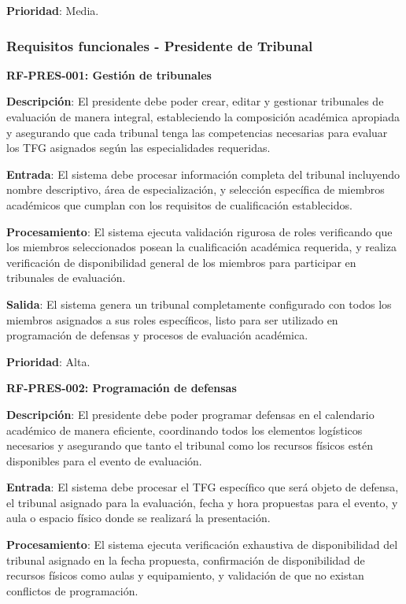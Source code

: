 \documentclass[12pt,a4paper,oneside]{report}
\begin{document}
\textbf{Prioridad}: Media.

\subsubsection{Requisitos funcionales - Presidente de
Tribunal}\label{requisitos-funcionales---presidente-de-tribunal}

\textbf{RF-PRES-001: Gestión de tribunales}

\textbf{Descripción}: El presidente debe poder crear, editar y gestionar tribunales de evaluación de manera integral, estableciendo la composición académica apropiada y asegurando que cada tribunal tenga las competencias necesarias para evaluar los TFG asignados según las especialidades requeridas.

\textbf{Entrada}: El sistema debe procesar información completa del tribunal incluyendo nombre descriptivo, área de especialización, y selección específica de miembros académicos que cumplan con los requisitos de cualificación establecidos.

\textbf{Procesamiento}: El sistema ejecuta validación rigurosa de roles verificando que los miembros seleccionados posean la cualificación académica requerida, y realiza verificación de disponibilidad general de los miembros para participar en tribunales de evaluación.

\textbf{Salida}: El sistema genera un tribunal completamente configurado con todos los miembros asignados a sus roles específicos, listo para ser utilizado en programación de defensas y procesos de evaluación académica.

\textbf{Prioridad}: Alta.

\textbf{RF-PRES-002: Programación de defensas}

\textbf{Descripción}: El presidente debe poder programar defensas en el calendario académico de manera eficiente, coordinando todos los elementos logísticos necesarios y asegurando que tanto el tribunal como los recursos físicos estén disponibles para el evento de evaluación.

\textbf{Entrada}: El sistema debe procesar el TFG específico que será objeto de defensa, el tribunal asignado para la evaluación, fecha y hora propuestas para el evento, y aula o espacio físico donde se realizará la presentación.

\textbf{Procesamiento}: El sistema ejecuta verificación exhaustiva de disponibilidad del tribunal asignado en la fecha propuesta, confirmación de disponibilidad de recursos físicos como aulas y equipamiento, y validación de que no existan conflictos de programación.
\end{document}
